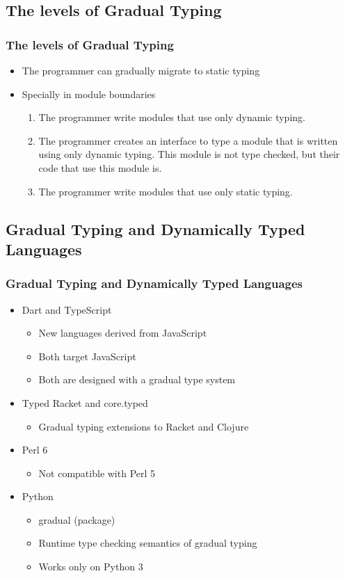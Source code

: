 \documentclass{beamer}
\begin{document}
\subsection{The levels of Gradual Typing}
\begin{frame}
\frametitle{The levels of Gradual Typing}
\begin{itemize}
\item The programmer can gradually migrate to static typing
\item Specially in module boundaries
\begin{enumerate}
\item The programmer write modules that use only dynamic typing.
\item The programmer creates an interface to type a module that
is written using only dynamic typing. This module is not
type checked, but their code that use this module is.
\item The programmer write modules that use only static typing.
\end{enumerate}
\end{itemize}
\end{frame}

\subsection{Gradual Typing and Dynamically Typed Languages}
\begin{frame}
\frametitle{Gradual Typing and Dynamically Typed Languages}
\begin{itemize}
\item Dart and TypeScript
\begin{itemize}
\item New languages derived from JavaScript
\item Both target JavaScript
\item Both are designed with a gradual type system
\end{itemize}
\item Typed Racket and core.typed
\begin{itemize}
\item Gradual typing extensions to Racket and Clojure
\end{itemize}
\item Perl 6
\begin{itemize}
\item Not compatible with Perl 5
\end{itemize}
\item Python
\begin{itemize}
\item gradual (package)
\item Runtime type checking semantics of gradual typing
\item Works only on Python 3
\end{itemize}
\end{itemize}
\end{frame}
\end{document}
